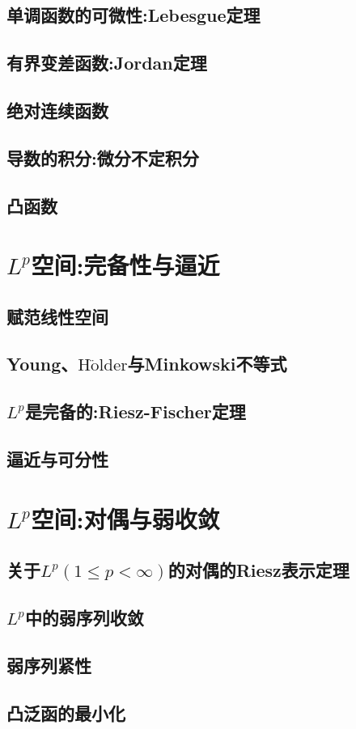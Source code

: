 \documentclass[lang=cn,newtx,10pt,scheme=chinese]{../Template/elegantbook}
\begin{document}
\section{单调函数的可微性:Lebesgue定理}

\section{有界变差函数:Jordan定理}

\section{绝对连续函数}

\section{导数的积分:微分不定积分}

\section{凸函数}






\chapter{$L^p$空间:完备性与逼近}

\section{赋范线性空间}

\section{Young、$\mathrm{H}\ddot{\mathrm{o}}\mathrm{lder}$与Minkowski不等式}

\section{$L^p$是完备的:Riesz-Fischer定理}

\section{逼近与可分性}





\chapter{$L^p$空间:对偶与弱收敛}

\section{关于$L^p(1\leqslant p<\infty)$的对偶的Riesz表示定理}

\section{$L^p$中的弱序列收敛}

\section{弱序列紧性}

\section{凸泛函的最小化}
\end{document}
